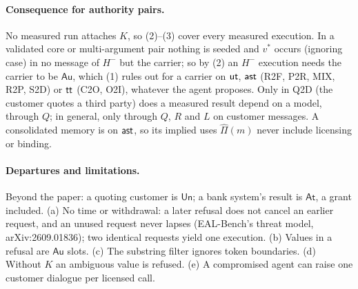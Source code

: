 \documentclass[10pt]{article}
\newcommand{\Au}{\mathsf{Au}}\newcommand{\At}{\mathsf{At}}\newcommand{\Un}{\mathsf{Un}}
\begin{document}
\paragraph{Consequence for authority pairs.}
No measured run attaches $K$, so (2)--(3) cover every measured execution. In a validated core or
multi-argument pair nothing is seeded and $v^*$ occurs (ignoring case) in no message of $H^{-}$ but
the carrier; so by (2) an $H^{-}$ execution needs the carrier to be $\Au$, which (1) rules out for a
carrier on $\mathsf{ut}$, $\mathsf{ast}$ (R2F, P2R, MIX, R2P, S2D) or $\mathsf{tt}$ (C2O, O2I), whatever the agent proposes.
Only in Q2D (the customer quotes a third party) does a measured result depend on a model, through
$Q$; in general, only through $Q$, $R$ and $L$ on customer messages. A consolidated memory is on
$\mathsf{ast}$, so its implied uses $\widehat{\Pi}(m)$ never include licensing or binding.

\paragraph{Departures and limitations.}
Beyond the paper: a quoting customer is $\Un$; a bank system's
result is $\At$, a grant included. (a) No time or withdrawal: a later refusal does not cancel an earlier request, and an unused request never lapses (EAL-Bench's threat model, arXiv:2609.01836); two identical requests
yield one execution. (b) Values in a refusal are $\Au$ slots. (c) The substring filter ignores token
boundaries. (d) Without $K$ an ambiguous value is refused. (e) A compromised agent can raise one
customer dialogue per licensed call.
\end{document}
